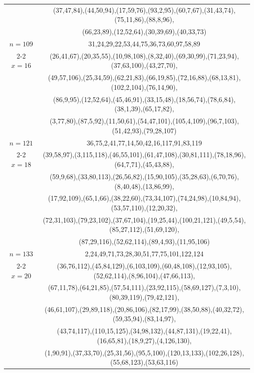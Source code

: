 \begin{tabular}{| c | c |}
&(37,47,84),(44,50,94),(17,59,76),(93,2,95),(60,7,67),(31,43,74),(75,11,86),(88,8,96),\\
&(66,23,89),(12,52,64),(30,39,69),(40,33,73)\\
\hline 
\(n=109\) & 
31,24,29,22,53,44,75,36,73,60,97,58,89\\
\cline{2-2}
\(x=16\)
&(26,41,67),(20,35,55),(10,98,108),(8,32,40),(69,30,99),(71,23,94),(37,63,100),(43,27,70),\\
&(49,57,106),(25,34,59),(62,21,83),(66,19,85),(72,16,88),(68,13,81),(102,2,104),(76,14,90),\\
&(86,9,95),(12,52,64),(45,46,91),(33,15,48),(18,56,74),(78,6,84),(38,1,39),(65,17,82),\\
&(3,77,80),(87,5,92),(11,50,61),(54,47,101),(105,4,109),(96,7,103),(51,42,93),(79,28,107)\\
\hline 
\(n=121\) & 
36,75,2,41,77,14,50,42,16,117,91,83,119\\
\cline{2-2}
\(x=18\)
&(39,58,97),(3,115,118),(46,55,101),(61,47,108),(30,81,111),(78,18,96),(64,7,71),(45,43,88),\\
&(59,9,68),(33,80,113),(26,56,82),(15,90,105),(35,28,63),(6,70,76),(8,40,48),(13,86,99),\\
&(17,92,109),(65,1,66),(38,22,60),(73,34,107),(74,24,98),(10,84,94),(53,57,110),(12,20,32),\\
&(72,31,103),(79,23,102),(37,67,104),(19,25,44),(100,21,121),(49,5,54),(85,27,112),(51,69,120),\\
&(87,29,116),(52,62,114),(89,4,93),(11,95,106)\\
\hline 
\(n=133\) & 
2,24,49,71,73,28,30,51,77,75,101,122,124\\
\cline{2-2}
\(x=20\)
&(36,76,112),(45,84,129),(6,103,109),(60,48,108),(12,93,105),(52,62,114),(8,96,104),(47,66,113),\\
&(67,11,78),(64,21,85),(57,54,111),(23,92,115),(58,69,127),(7,3,10),(80,39,119),(79,42,121),\\
&(46,61,107),(29,89,118),(20,86,106),(82,17,99),(38,50,88),(40,32,72),(59,35,94),(83,14,97),\\
&(43,74,117),(110,15,125),(34,98,132),(44,87,131),(19,22,41),(16,65,81),(18,9,27),(4,126,130),\\
&(1,90,91),(37,33,70),(25,31,56),(95,5,100),(120,13,133),(102,26,128),(55,68,123),(53,63,116)\\
\hline 
\end{tabular}